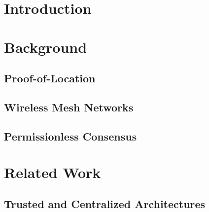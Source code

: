 


\newpage
\section{Introduction} \label{sec:introduction}



\newpage
\section{Background} \label{sec:background}



\subsection{Proof-of-Location} \label{sec:background-proof-of-location}



\subsection{Wireless Mesh Networks} \label{sec:background-wireless-mesh-networks}



\subsection{Permissionless Consensus} \label{sec:background-permissionless-consensus}



\newpage
\section{Related Work} \label{sec:related-work}



\subsection{Trusted and Centralized Architectures} \label{sec:related-work-trusted-centralized}

